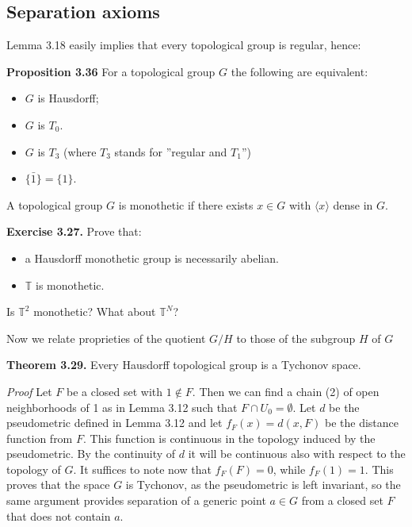 \documentclass[12pt]{article}
\begin{document}
\subsection{Separation axioms}


    Lemma 3.18 easily implies that every topological group is regular, hence:

    
\textbf{Proposition 3.36} For a topological group $G$ the following are equivalent:

    
    \begin{itemize}

        \item $G$ is Hausdorff;
       
        \item $G$ is $T_0$.

        \item $G$ is $T_3$ (where $T_3$ stands for ”regular and $T_1$”)
       
        \item $\bar{\{1\}} = \{1\}$.
    
    \end{itemize}


    A topological group $G$ is monothetic if there exists $x \in G$ with $\langle x \rangle$ dense in $G$.


\textbf{Exercise 3.27.} Prove that:


    \begin{itemize}

        \item a Hausdorff monothetic group is necessarily abelian.
    
        \item $\mathbb{T}$ is monothetic.

    \end{itemize}


    Is $\mathbb{T}^2$ monothetic? What about $\mathbb{T}^N$?


    Now we relate proprieties of the quotient $G/H$ to those of the subgroup $H$ of $G$


    \textbf{Theorem 3.29.} Every Hausdorff topological group is a Tychonov space.

        \emph{Proof}  Let $F$ be a closed set with $1 \notin F$. Then we can find a chain (2) of open neighborhoods of 1 as in Lemma
        3.12 such that $F \cap U_0 = \emptyset$. Let $d$ be the pseudometric defined in Lemma 3.12 and let $f_F (x) = d(x, F)$ be
        the distance function from $F$. This function is continuous in the topology induced by the pseudometric. By
        the continuity of $d$ it will be continuous also with respect to the topology of $G$. It suffices to note now that
        $f_F (F) = 0$, while $f_F (1) = 1$. This proves that the space $G$ is Tychonov, as the pseudometric is left invariant,
        so the same argument provides separation of a generic point $a \in G$ from a closed set $F$ that does not contain
        $a$.
\end{document}
